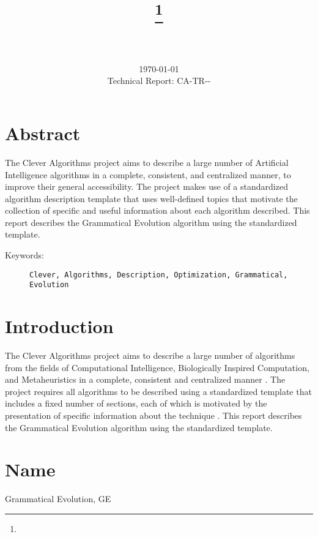 \documentclass[a4paper, 11pt]{article}
\title{{\myreporttitle}\footnote{\myreportlicense}}
\author{\myreportauthor\\{\myreportemail}\\\small\myreportproject}
\date{\today\\{\small{Technical Report: CA-TR-{\myreportdate}-\myreportversion}}}
\begin{document}
\maketitle

\section*{Abstract} 
The Clever Algorithms project aims to describe a large number of Artificial Intelligence algorithms in a complete, consistent, and centralized manner, to improve their general accessibility. 
The project makes use of a standardized algorithm description template that uses well-defined topics that motivate the collection of specific and useful information about each algorithm described.
This report describes the Grammatical Evolution algorithm using the standardized template.

\begin{description}
	\item[Keywords:] {\small\texttt{Clever, Algorithms, Description, Optimization, Grammatical, Evolution}}
\end{description} 

\section{Introduction} 
\label{sec:intro}
The Clever Algorithms project aims to describe a large number of algorithms from the fields of Computational Intelligence, Biologically Inspired Computation, and Metaheuristics in a complete, consistent and centralized manner \cite{Brownlee2010}.
The project requires all algorithms to be described using a standardized template that includes a fixed number of sections, each of which is motivated by the presentation of specific information about the technique \cite{Brownlee2010a}.
This report describes the Grammatical Evolution algorithm using the standardized template.

\section{Name} 
\label{sec:name}
Grammatical Evolution, GE
\end{document}
